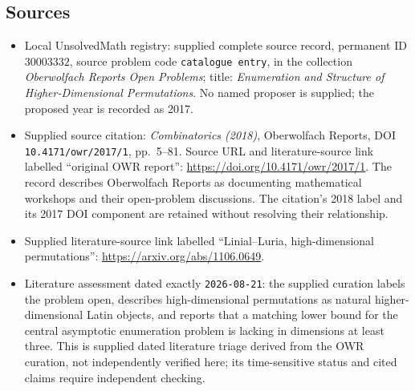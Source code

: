 \documentclass[11pt]{article}
\begin{document}
\subsection{Sources}
\begin{itemize}
\item Local UnsolvedMath registry: supplied complete source record, permanent ID \(30003332\), source problem code \texttt{catalogue entry}, in the collection \emph{Oberwolfach Reports Open Problems}; title: \emph{Enumeration and Structure of Higher-Dimensional Permutations}. No named proposer is supplied; the proposed year is recorded as 2017.
\item Supplied source citation: \emph{Combinatorics (2018)}, Oberwolfach Reports, DOI \texttt{10.4171/owr/2017/1}, pp.~5--81. Source URL and literature-source link labelled ``original OWR report'': \url{https://doi.org/10.4171/owr/2017/1}. The record describes Oberwolfach Reports as documenting mathematical workshops and their open-problem discussions. The citation's 2018 label and its 2017 DOI component are retained without resolving their relationship.
\item Supplied literature-source link labelled ``Linial--Luria, high-dimensional permutations'': \url{https://arxiv.org/abs/1106.0649}.
\item Literature assessment dated exactly \texttt{2026-08-21}: the supplied curation labels the problem open, describes high-dimensional permutations as natural higher-dimensional Latin objects, and reports that a matching lower bound for the central asymptotic enumeration problem is lacking in dimensions at least three. This is supplied dated literature triage derived from the OWR curation, not independently verified here; its time-sensitive status and cited claims require independent checking.
\end{itemize}
\end{document}
